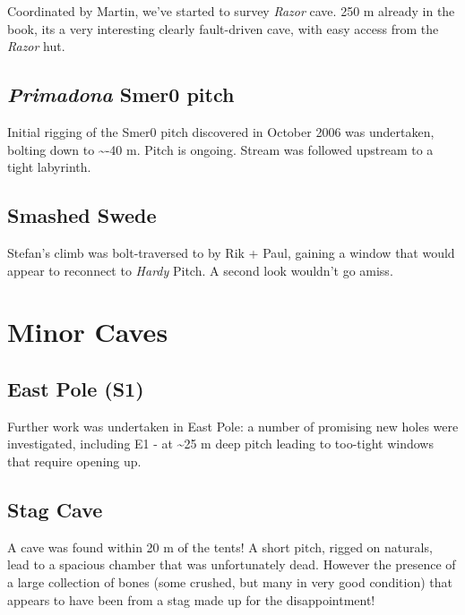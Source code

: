 Coordinated by Martin, we've started to survey \emph{Razor} cave. 250 m
already in the book, its a very interesting clearly fault-driven cave,
with easy access from the \emph{Razor} hut.

\hypertarget{primadona-smer0-pitch}{%
\subsection{\texorpdfstring{\emph{Primadona} Smer0
pitch}{Primadona Smer0 pitch}}\label{primadona-smer0-pitch}}

Initial rigging of the Smer0 pitch discovered in October 2006 was
undertaken, bolting down to \textasciitilde{}-40 m. Pitch is ongoing.
Stream was followed upstream to a tight labyrinth.

\hypertarget{smashed-swede}{%
\subsection{Smashed Swede}\label{smashed-swede}}

Stefan's climb was bolt-traversed to by Rik + Paul, gaining a window
that would appear to reconnect to \emph{Hardy} Pitch. A second look
wouldn't go amiss.

\hypertarget{minor-caves}{%
\section{Minor Caves}\label{minor-caves}}

\hypertarget{east-pole-s1}{%
\subsection{East Pole (S1)}\label{east-pole-s1}}

Further work was undertaken in East Pole: a number of promising new
holes were investigated, including E1 - at \textasciitilde{}25 m deep
pitch leading to too-tight windows that require opening up.

\hypertarget{stag-cave}{%
\subsection{Stag Cave}\label{stag-cave}}

A cave was found within 20 m of the tents! A short pitch, rigged on
naturals, lead to a spacious chamber that was unfortunately dead.
However the presence of a large collection of bones (some crushed, but
many in very good condition) that appears to have been from a stag made
up for the disappointment!

